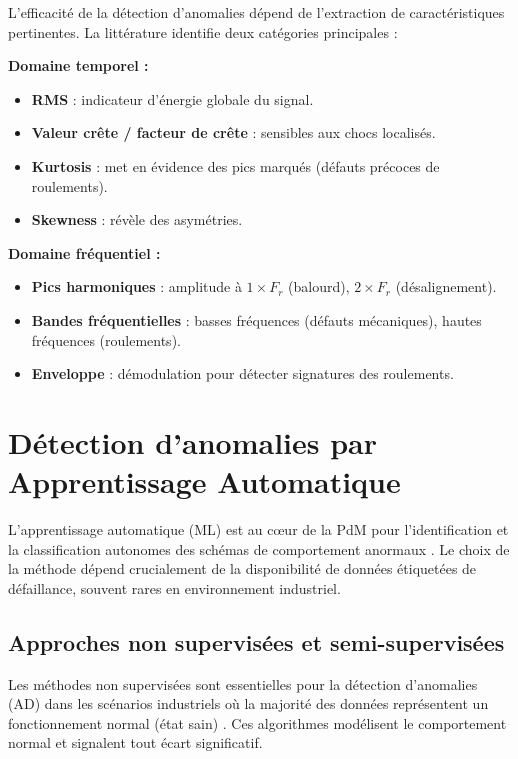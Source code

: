 L'efficacité de la détection d'anomalies dépend de l'extraction de caractéristiques pertinentes. La littérature identifie deux catégories principales \cite{ran2019,tiboni2022} :

\textbf{Domaine temporel :}
\begin{itemize}
\item \textbf{RMS} : indicateur d'énergie globale du signal.
\item \textbf{Valeur crête / facteur de crête} : sensibles aux chocs localisés.
\item \textbf{Kurtosis} : met en évidence des pics marqués (défauts précoces de roulements).
\item \textbf{Skewness} : révèle des asymétries.
\end{itemize}

\textbf{Domaine fréquentiel :}
\begin{itemize}
\item \textbf{Pics harmoniques} : amplitude à $1 \times F_r$ (balourd), $2 \times F_r$ (désalignement).
\item \textbf{Bandes fréquentielles} : basses fréquences (défauts mécaniques), hautes fréquences (roulements).
\item \textbf{Enveloppe} : démodulation pour détecter signatures des roulements.
\end{itemize}


\section{Détection d'anomalies par Apprentissage Automatique}
\label{sec:detection_anomalies}

L'apprentissage automatique (ML) est au cœur de la PdM pour l'identification et la classification autonomes des schémas de comportement anormaux \cite{achouch2022,chandola2009}. Le choix de la méthode dépend crucialement de la disponibilité de données étiquetées de défaillance, souvent rares en environnement industriel.

\subsection{Approches non supervisées et semi-supervisées}

Les méthodes non supervisées sont essentielles pour la détection d'anomalies (AD) dans les scénarios industriels où la majorité des données représentent un fonctionnement normal (état sain) \cite{arciniegas2025}. Ces algorithmes modélisent le comportement normal et signalent tout écart significatif.

